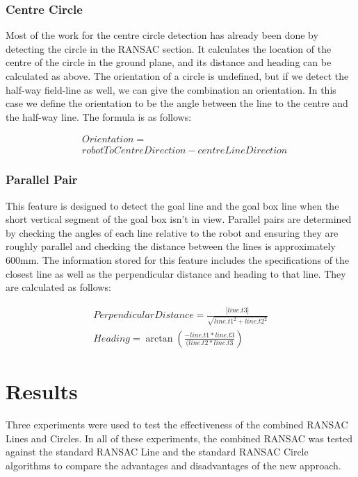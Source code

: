 \documentclass[runningheads,a4paper]{llncs}
\begin{document}
\subsubsection{Centre Circle}
Most of the work for the centre circle detection has already been done by detecting the circle in the RANSAC section. It calculates the location of the centre of the circle in the ground plane, and its distance and heading can be calculated as above. The orientation of a circle is undefined, but if we detect the half-way field-line as well, we can give the combination an orientation. In this case we define the orientation to be the angle between the line to the centre and the half-way line. The formula is as follows:

\begin{eqnarray}
& Orientation = \nonumber \\ 
& robotToCentreDirection - centreLineDirection
\end{eqnarray}



\subsubsection{Parallel Pair}
This feature is designed to detect the goal line and the goal box line when the short vertical segment of the goal box isn't in view. Parallel pairs are determined by checking the angles of each line relative to the robot and ensuring they are roughly parallel and checking the distance between the lines is approximately 600mm. The information stored for this feature includes the specifications of the closest line as well as the perpendicular distance and heading to that line. They are calculated as follows:

\begin{eqnarray}
Perpendicular Distance = \frac{|line.t3|}{\sqrt{line.t1^2 + line.t2^2}}\\
Heading = \arctan{(\frac{-line.t1 * line.t3}{(line.t2 * line.t3})}
\end{eqnarray}


\section{Results}
Three experiments were used to test the effectiveness of the combined RANSAC Lines and Circles. In all of these experiments, the combined RANSAC was tested against the standard RANSAC Line and the standard RANSAC Circle algorithms to compare the advantages and disadvantages of the new approach.
\end{document}
